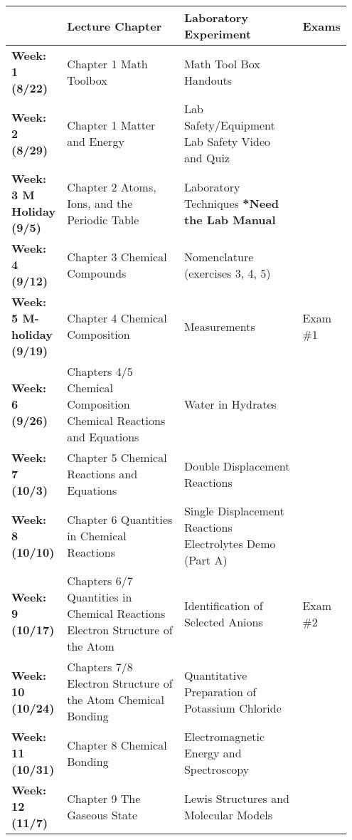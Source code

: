 \documentclass[11pt]{article}
\begin{document}
\begin{table}[H]
\label{tab:chem_cal}
\begin{tabular}{|p{0.15\linewidth}|p{0.35\linewidth}|p{0.35\linewidth}|p{0.1\linewidth}|}
  \hline
  & Lecture Chapter & Laboratory Experiment & Exams \\
  \hline
  \textbf{Week: 1 (8/22)} & Chapter 1 Math Toolbox & Math Tool Box Handouts &  \\
  
  \textbf{Week: 2 (8/29)} & Chapter 1 Matter and Energy & Lab Safety/Equipment Lab Safety Video and Quiz &  \\
  
  \textbf{Week: 3 M Holiday (9/5)} & Chapter 2 Atoms, Ions, and the Periodic Table & Laboratory Techniques
  \textbf{*Need the Lab Manual} &  \\

  \textbf{Week: 4 (9/12)} & Chapter 3 Chemical Compounds & Nomenclature (exercises 3, 4, 5) &  \\

  \textbf{Week: 5 M-holiday (9/19)} & Chapter 4 Chemical Composition & Measurements & Exam \#1 \\

  \textbf{Week: 6 (9/26)} & Chapters  4/5 Chemical Composition Chemical Reactions and Equations
  & Water in Hydrates &  \\

  \textbf{Week: 7 (10/3)} & Chapter 5 Chemical Reactions and Equations & Double Displacement Reactions &  \\

  \textbf{Week: 8 (10/10)} & Chapter 6 Quantities in Chemical Reactions & Single Displacement Reactions
  Electrolytes Demo (Part A) & \\

  \textbf{Week: 9 (10/17)} & Chapters 6/7 Quantities in Chemical Reactions Electron Structure of the Atom
  & Identification of Selected Anions & Exam \#2 \\

  \textbf{Week: 10 (10/24)} & Chapters 7/8 Electron Structure of the Atom Chemical Bonding
  & Quantitative Preparation of Potassium Chloride &  \\

  \textbf{Week: 11 (10/31)} & Chapter 8 Chemical Bonding & Electromagnetic Energy and Spectroscopy &  \\

  \textbf{Week: 12 (11/7)} & Chapter 9 The Gaseous State & Lewis Structures and Molecular Models &  \\


\end{tabular}
\end{table}
\end{document}
